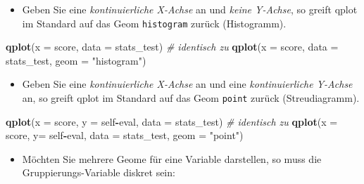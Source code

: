 \documentclass[12pt,ngerman,]{book}
\makeatletter
\newenvironment{Shaded}{\begin{snugshade}}{\end{snugshade}}
\newcommand{\KeywordTok}[1]{\textcolor[rgb]{0.13,0.29,0.53}{\textbf{#1}}}
\newcommand{\DataTypeTok}[1]{\textcolor[rgb]{0.13,0.29,0.53}{#1}}
\newcommand{\StringTok}[1]{\textcolor[rgb]{0.31,0.60,0.02}{#1}}
\newcommand{\CommentTok}[1]{\textcolor[rgb]{0.56,0.35,0.01}{\textit{#1}}}
\newcommand{\OperatorTok}[1]{\textcolor[rgb]{0.81,0.36,0.00}{\textbf{#1}}}
\newcommand{\NormalTok}[1]{#1}
\providecommand{\tightlist}{%
  \setlength{\itemsep}{0pt}\setlength{\parskip}{0pt}}
\newenvironment{kframe}{%
\medskip{}
\setlength{\fboxsep}{.8em}
 \def\at@end@of@kframe{}%
 \ifinner\ifhmode%
  \def\at@end@of@kframe{\end{minipage}}%
  \begin{minipage}{\columnwidth}%
 \fi\fi%
 \def\FrameCommand##1{\hskip\@totalleftmargin \hskip-\fboxsep
 \colorbox{shadecolor}{##1}\hskip-\fboxsep
     \hskip-\linewidth \hskip-\@totalleftmargin \hskip\columnwidth}%
 \MakeFramed {\advance\hsize-\width
   \@totalleftmargin\z@ \linewidth\hsize
   \@setminipage}}%
 {\par\unskip\endMakeFramed%
 \at@end@of@kframe}
\renewenvironment{Shaded}{\begin{kframe}}{\end{kframe}}
\theoremstyle{definition}
\theoremstyle{definition}
\theoremstyle{remark}
\makeatother
\begin{document}
\begin{itemize}
\tightlist
\item
  Geben Sie eine \emph{kontinuierliche X-Achse} an und \emph{keine
  Y-Achse}, so greift qplot im Standard auf das Geom \texttt{histogram}
  zurück (Histogramm).
\end{itemize}

\begin{Shaded}
\begin{Highlighting}[]
\KeywordTok{qplot}\NormalTok{(}\DataTypeTok{x =}\NormalTok{ score, }\DataTypeTok{data =}\NormalTok{ stats_test)  }\CommentTok{# identisch zu}
\KeywordTok{qplot}\NormalTok{(}\DataTypeTok{x =}\NormalTok{ score, }\DataTypeTok{data =}\NormalTok{ stats_test, }\DataTypeTok{geom =} \StringTok{"histogram"}\NormalTok{)}
\end{Highlighting}
\end{Shaded}

\begin{itemize}
\tightlist
\item
  Geben Sie eine \emph{kontinuierliche X-Achse} an und eine
  \emph{kontinuierliche Y-Achse} an, so greift qplot im Standard auf das
  Geom \texttt{point} zurück (Streudiagramm).
\end{itemize}

\begin{Shaded}
\begin{Highlighting}[]
\KeywordTok{qplot}\NormalTok{(}\DataTypeTok{x =}\NormalTok{ score, }\DataTypeTok{y =}\NormalTok{ self}\OperatorTok{-}\NormalTok{eval, }\DataTypeTok{data =}\NormalTok{ stats_test)  }\CommentTok{# identisch zu}
\KeywordTok{qplot}\NormalTok{(}\DataTypeTok{x =}\NormalTok{ score, }\DataTypeTok{y=}\NormalTok{  self}\OperatorTok{-}\NormalTok{eval, }\DataTypeTok{data =}\NormalTok{ stats_test, }\DataTypeTok{geom =} \StringTok{"point"}\NormalTok{)}
\end{Highlighting}
\end{Shaded}

\begin{itemize}
\tightlist
\item
  Möchten Sie mehrere Geome für eine Variable darstellen, so muss die
  Gruppierungs-Variable diskret sein:
\end{itemize}
\end{document}

